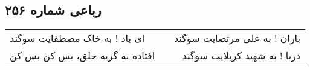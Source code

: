\begin{center}
\section*{رباعی شماره ۲۵۶}
\label{sec:sh256}
\begin{longtable}{l p{0.5cm} r}
ای باد ! به خاک مصطفایت سوگند
&&
باران ! به علی مرتضایت سوگند
\\
افتاده به گریه خلق، بس کن بس کن
&&
دریا ! به شهید کربلایت سوگند
\\
\end{longtable}
\end{center}
